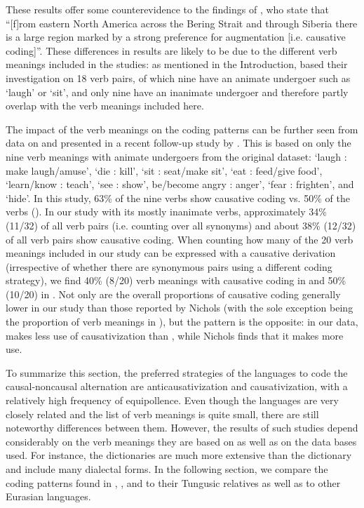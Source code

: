 \documentclass[output=paper,colorlinks,citecolor=brown]{langscibook}
\begin{document}
These results offer some counterevidence to the findings of \citet[180]{Nichols2004}, who state that “[f]rom eastern North America across the Bering Strait and through Siberia there is a large region marked by a strong preference for augmentation [i.e. causative coding]”. These differences in results are likely to be due to the different verb meanings included in the studies: as mentioned in the Introduction, \citet{Nichols2004} based their investigation on 18 verb pairs, of which nine have an animate undergoer such as ‘laugh’ or ‘sit’, and only nine have an inanimate undergoer and therefore partly overlap with the verb meanings included here.

The impact of the verb meanings on the coding patterns can be further seen from data on  and  presented in a recent follow-up study by \citet{Nichols2018}. This is based on only the nine verb meanings with animate undergoers from the original dataset: ‘laugh : make laugh/amuse’, ‘die : kill’, ‘sit : seat/make sit’, ‘eat : feed/give food’, ‘learn/know : teach’, ‘see : show’, be/become angry : anger’, ‘fear : frighten’, and ‘hide’. In this study, 63\% of the nine  verbs show causative coding vs. 50\% of the  verbs (\citealt[Table 6]{Nichols2018}). In our study with its mostly inanimate verbs, approximately 34\% (11/32) of all  verb pairs (i.e. counting over all synonyms) and about 38\% (12/32) of all  verb pairs show causative coding. When counting how many of the 20 verb meanings included in our study can be expressed with a causative derivation (irrespective of whether there are synonymous pairs using a different coding strategy), we find 40\% (8/20) verb meanings with causative coding in  and 50\% (10/20) in . Not only are the overall proportions of causative coding generally lower in our study than those reported by Nichols (with the sole exception being the proportion of verb meanings in ), but the pattern is the opposite: in our data,  makes less use of causativization than , while Nichols finds that it makes more use. 

To summarize this section, the preferred strategies of the  languages to code the causal-noncausal alternation are anticausativization and causativization, with a relatively high frequency of equipollence. Even though the languages are very closely related and the list of verb meanings is quite small, there are still noteworthy differences between them. However, the results of such studies depend considerably on the verb meanings they are based on as well as on the data bases used. For instance, the  dictionaries are much more extensive than the  dictionary and include many dialectal forms. In the following section, we compare the coding patterns found in , , and  to their Tungusic relatives as well as to other Eurasian languages.
\end{document}

